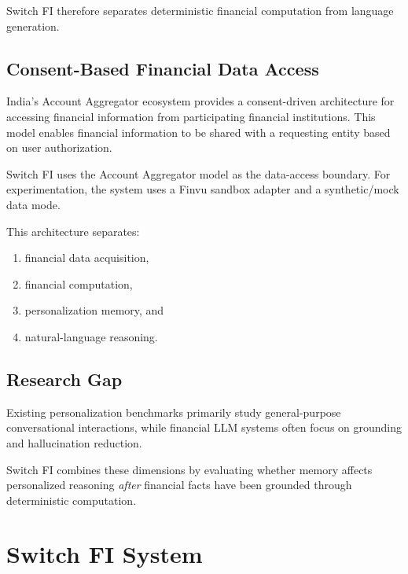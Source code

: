 \documentclass[conference]{IEEEtran}
\begin{document}
    Switch FI therefore separates deterministic financial computation from
    language generation.
    
    \subsection{Consent-Based Financial Data Access}
    
    India's Account Aggregator ecosystem provides a consent-driven
    architecture for accessing financial information from participating
    financial institutions. This model enables financial information to be
    shared with a requesting entity based on user authorization.
    
    Switch FI uses the Account Aggregator model as the data-access boundary.
    For experimentation, the system uses a Finvu sandbox adapter and a
    synthetic/mock data mode.
    
    This architecture separates:
    
    \begin{enumerate}
        \item financial data acquisition,
        \item financial computation,
        \item personalization memory, and
        \item natural-language reasoning.
    \end{enumerate}
    
    \subsection{Research Gap}
    
    Existing personalization benchmarks primarily study general-purpose
    conversational interactions, while financial LLM systems often focus on
    grounding and hallucination reduction.
    
    Switch FI combines these dimensions by evaluating whether memory affects
    personalized reasoning \textit{after} financial facts have been grounded
    through deterministic computation.
    
    
    \section{Switch FI System}
    
\end{document}

